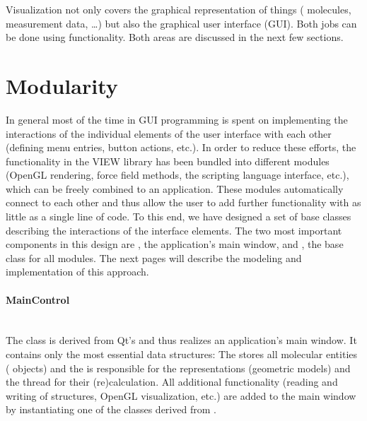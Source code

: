 \noindent
Visualization not only covers the graphical representation of things (\eg
molecules, measurement data, \dots) but also the graphical user interface
(GUI). Both jobs can be done using  functionality. Both areas are
discussed in the next few sections.

\section{Modularity}
In general most of the time in GUI programming is spent on implementing the 
interactions of the individual elements of the user interface with each other 
(\eg defining menu entries, button actions, etc.). In order to reduce these 
efforts, the functionality in the VIEW library has been bundled into different
modules (\eg OpenGL rendering, force field methods, the scripting language 
interface, etc.), which can be freely combined to an application. These modules
automatically connect to each other and thus allow the user to add further 
functionality with as little as a single line of code. To this end, we have 
designed a set of  base classes describing the interactions of the interface 
elements. The two most important components in this design are 
, the application's main window, and 
, the base class for all modules.
The next pages will describe the modeling and implementation of this approach.
\label{modularity}

\paragraph{MainControl} 
\hspace*{\fill}\\
The class  is derived from Qt's  and thus
realizes an application's main window. It contains only the most essential data
structures: The  stores all molecular entities
( objects) and the  is responsible for
the representations (\ie geometric models) and the thread for their
(re)calculation. All additional functionality (\eg reading and writing of 
structures, OpenGL visualization, etc.) are added to the main window by 
instantiating one of the classes derived from . 

